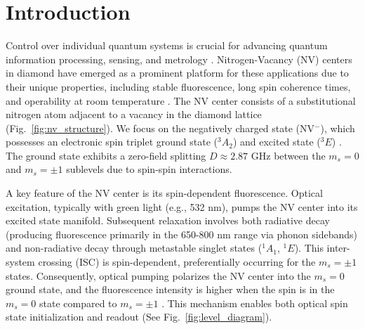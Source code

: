 \documentclass[aps,prb,twocolumn,superscriptaddress,floatfix,longbibliography,citeautoscript]{revtex4-2}
\begin{document}
\maketitle

\section{\label{sec:intro}Introduction}

Control over individual quantum systems is crucial for advancing quantum information processing, sensing, and metrology \cite{Awschalom2007ScientificAmerican}. %
Nitrogen-Vacancy (NV) centers in diamond have emerged as a prominent platform for these applications due to their unique properties, including stable fluorescence, long spin coherence times, and operability at room temperature \cite{Childress2007Thesis}. %
The NV center consists of a substitutional nitrogen atom adjacent to a vacancy in the diamond lattice (Fig.~\ref{fig:nv_structure}). We focus on the negatively charged state (NV$^-$), which possesses an electronic spin triplet ground state ($^3 A_2$) and excited state ($^3 E$) \cite{Maze2011NJP, Manson2006}. %
The ground state exhibits a zero-field splitting $D \approx 2.87$ GHz between the $m_s=0$ and $m_s=\pm 1$ sublevels due to spin-spin interactions. 

A key feature of the NV center is its spin-dependent fluorescence. Optical excitation, typically with green light (e.g., 532 nm), pumps the NV center into its excited state manifold. Subsequent relaxation involves both radiative decay (producing fluorescence primarily in the 650-800 nm range via phonon sidebands) and non-radiative decay through metastable singlet states ($^1 A_1$, $^1 E$). This inter-system crossing (ISC) is spin-dependent, preferentially occurring for the $m_s=\pm 1$ states. Consequently, optical pumping polarizes the NV center into the $m_s=0$ ground state, and the fluorescence intensity is higher when the spin is in the $m_s=0$ state compared to $m_s=\pm 1$ \cite{Manson2006, Wrachtrup2006JPhysCondensMatter}. This mechanism enables both optical spin state initialization and readout (See Fig.~\ref{fig:level_diagram}). %
\end{document}
